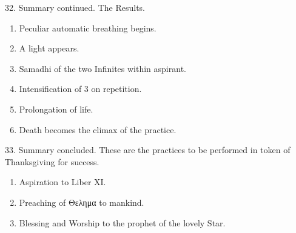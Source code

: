32. Summary continued. The Results.
\begin{enumerate}[leftmargin=4\parindent]
\item Peculiar automatic breathing begins.
\item A light appears.
\item Samadhi of the two Infinites within aspirant.
\item Intensification of 3 on repetition.
\item Prolongation of life.
\item Death becomes the climax of the practice.
\end{enumerate}

33. Summary concluded. These are the practices to be performed in token of Thanksgiving for success.
\begin{enumerate}[leftmargin=4\parindent]
\item Aspiration to Liber XI.
\item Preaching of \textgreek{Θελημα} to mankind.
\item Blessing and Worship to the prophet of the lovely Star.
\end{enumerate}
